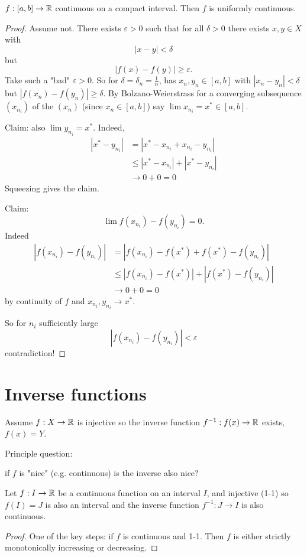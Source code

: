 \begin{theorem}\label{thm:contoncompactisuniform}
    $f : [a, b] \to \mathbb{R}$ continuous on a compact interval.
    Then $f$ is uniformly continuous.
\end{theorem}
\begin{proof}
    Assume not.
    There exists $\varepsilon > 0$ such that for all $\delta > 0$ there exists $x, y \in X$ with
    \[
    |x - y| < \delta
    \]
    but
    \[
    |f(x) - f(y)| \geq \varepsilon.
    \]
    Take such a "bad" $\varepsilon > 0$.
    So for $\delta = \delta_n = \frac{1}{n}$,
    has $x_n, y_n \in [a, b]$ with $|x_n - y_n| < \delta$ but $|f(x_n) - f(y_n)| \geq \delta$.
    By Bolzano-Weierstrass for a converging subsequence $(x_{n_i})$ of the $(x_n)$
    (since $x_n \in [a, b]$)
    say $\lim x_{n_i} = x ^ {*} \in [a, b]$.

    Claim:
    also $\lim y_{n_i} = x ^ {*}$.
    Indeed,
    \begin{align*}
        |x ^ {*} - y_{n_i}| &= |x ^ {*} - x_{n_i} + x_{n_i} - y_{n_i}| \\
        &\leq |x ^ {*} - x_{n_i}| + |x ^ {*} - y_{n_i}| \\
        &\to 0 + 0 = 0
    \end{align*}
    Squeezing gives the claim.

    Claim:
    \[
    \lim f(x_{n_i}) - f(y_{n_i}) = 0.
    \]
    Indeed
    \begin{align*}
        |f(x_{n_i}) - f(y_{n_i})| &= |f(x_{n_i}) - f(x ^ {*}) + f(x ^ {*}) - f(y_{n_i})| \\
        &\leq |f(x_{n_i}) - f(x ^ {*})| + |f(x ^ {*}) - f(y_{n_i})| \\
        &\to 0 + 0 = 0
    \end{align*}
    by continuity of $f$ and $x_{n_i}, y_{n_i} \to x ^ {*}$.

    So for $n_i$ sufficiently large
    \[
    |f(x_{n_i}) - f(y_{n_i})| < \varepsilon
    \]
    contradiction!
\end{proof}

\section{Inverse functions}
Assume $f : X \to \mathbb{R}$ is injective so the inverse function $f ^ {-1} : f(x) \to \mathbb{R}$ exists,
$f(x) = Y$.

Principle question:

if $f$ is "nice"
(e.g. continuous)
is the inverse also nice?

\begin{theorem}\label{thm:inversefunction}
    Let $f : I \to \mathbb{R}$ be a continuous function on an interval $I$,
    and injective
    (1-1)
    so $f(I) = J$ is also an interval and the inverse function $f ^ {-1} : J \to I$ is also continuous.
\end{theorem}
\begin{proof}
    One of the key steps:
    if $f$ is continuous and 1-1.
    Then $f$ is either strictly monotonically increasing or decreasing.
\end{proof}